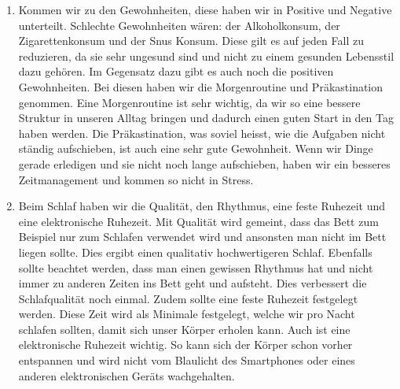 \begin{enumerate}
  \item Kommen wir zu den Gewohnheiten, diese haben wir in Positive und Negative unterteilt. Schlechte Gewohnheiten wären: der Alkoholkonsum, der Zigarettenkonsum und der Snus Konsum. Diese gilt es auf jeden Fall zu reduzieren, da sie sehr ungesund sind und nicht zu einem gesunden Lebensstil dazu gehören. Im Gegensatz dazu gibt es auch noch die positiven Gewohnheiten. Bei diesen haben wir die Morgenroutine und Präkastination genommen. Eine Morgenroutine ist sehr wichtig, da wir so eine bessere Struktur in unseren Alltag bringen und dadurch einen guten Start in den Tag haben werden. Die Präkastination, was soviel heisst, wie die Aufgaben nicht ständig aufschieben, ist auch eine sehr gute Gewohnheit. Wenn wir Dinge gerade erledigen und sie nicht noch lange aufschieben, haben wir ein besseres Zeitmanagement und kommen so nicht in Stress.
  \item Beim Schlaf haben wir die Qualität, den Rhythmus, eine feste Ruhezeit und eine elektronische Ruhezeit. Mit Qualität wird gemeint, dass das Bett zum Beispiel nur zum Schlafen verwendet wird und ansonsten man nicht im Bett liegen sollte. Dies ergibt einen qualitativ hochwertigeren Schlaf. Ebenfalls sollte beachtet werden, dass man einen gewissen Rhythmus hat und nicht immer zu anderen Zeiten ins Bett geht und aufsteht. Dies verbessert die Schlafqualität noch einmal. Zudem sollte eine feste Ruhezeit festgelegt werden. Diese Zeit wird als Minimale festgelegt, welche wir pro Nacht schlafen sollten, damit sich unser Körper erholen kann. Auch ist eine elektronische Ruhezeit wichtig. So kann sich der Körper schon vorher entspannen und wird nicht vom Blaulicht des Smartphones oder eines anderen elektronischen Geräts wachgehalten.
\end{enumerate}